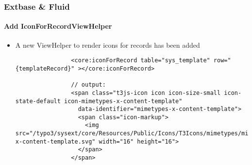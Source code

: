 \begin{frame}[fragile]
	\frametitle{Extbase \& Fluid}
	\framesubtitle{Add IconForRecordViewHelper}

	\lstset{basicstyle=\tiny\ttfamily}

	\begin{itemize}

		\item A new ViewHelper to render icons for records has been added

			\begin{lstlisting}
				<core:iconForRecord table="sys_template" row="{templateRecord}" ></core:iconForRecord>

				// output:
				<span class="t3js-icon icon icon-size-small icon-state-default icon-mimetypes-x-content-template"
				  data-identifier="mimetypes-x-content-template">
				  <span class="icon-markup">
				    <img src="/typo3/sysext/core/Resources/Public/Icons/T3Icons/mimetypes/mimetypes-x-content-template.svg" width="16" height="16">
				  </span>
				</span>
			\end{lstlisting}

	\end{itemize}

\end{frame}


